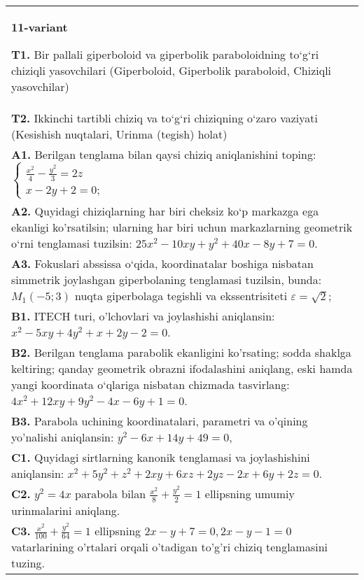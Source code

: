 \documentclass{article}
\begin{document}
\begin{tabular}{m{17cm}}
\textbf{11-variant}
\newline

\textbf{T1.} Bir pallali giperboloid va giperbolik paraboloidning to‘g‘ri chiziqli yasovchilari (Giperboloid, Giperbolik paraboloid, Chiziqli yasovchilar) \\
\textbf{T2.} Ikkinchi tartibli chiziq va to‘g‘ri chiziqning o‘zaro vaziyati (Kesishish nuqtalari, Urinma (tegish) holat) \\
\textbf{A1.} Berilgan tenglama bilan qaysi chiziq aniqlanishini toping: $\left\{\begin{array}{l}\frac{x^2}{4}-\frac{y^2}{3}=2 z \\ x-2 y+2=0 ;\end{array}\right.$ \\
\textbf{A2.} Quyidagi chiziqlarning har biri cheksiz ko‘p markazga ega ekanligi ko'rsatilsin; ularning har biri uchun markazlarning geometrik o‘rni tenglamasi tuzilsin: $25 x^2-10 x y+y^2+40 x-8 y+7=0$. \\
\textbf{A3.} Fokuslari abssissa o‘qida, koordinatalar boshiga nisbatan simmetrik joylashgan giperbolaning tenglamasi tuzilsin, bunda: $M_1(-5 ; 3)$ nuqta giperbolaga tegishli va ekssentrisiteti $\varepsilon=\sqrt{2}$; \\
\textbf{B1.} ITECH turi, o'lchovlari va joylashishi aniqlansin: $x^2-5 x y+4 y^2+x+2 y-2=0$. \\
\textbf{B2.} Berilgan tenglama parabolik ekanligini ko'rsating; sodda shaklga keltiring; qanday geometrik obrazni ifodalashini aniqlang, eski hamda yangi koordinata o‘qlariga nisbatan chizmada tasvirlang: $4 x^2+12 x y+9 y^2-4 x-6 y+1=0$. \\
\textbf{B3.} Parabola uchining koordinatalari, parametri va o'qining yo'nalishi aniqlansin: $y^2-6 x+14 y+49=0$, \\
\textbf{C1.} Quyidagi sirtlarning kanonik tenglamasi va joylashishini aniqlansin: $x^2+5 y^2+z^2+2 x y+6 x z+2 y z-2 x+6 y+2 z=0$. \\
\textbf{C2.} $y^2=4 x$ parabola bilan $\frac{x^2}{8}+\frac{y^2}{2}=1$ ellipsning umumiy urinmalarini aniqlang. \\
\textbf{C3.} $\frac{x^2}{100}+\frac{y^2}{64}=1$ ellipsning $2 x-y+7=0,2 x-y-1=0$ vatarlarining o'rtalari orqali o'tadigan to'g'ri chiziq tenglamasini tuzing. \\

\end{tabular}
\vspace{1cm}
\end{document}
